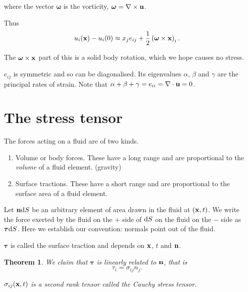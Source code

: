 \documentclass{notes}
\newcommand{\om}{\boldsymbol{\omega}}
\newcommand{\bt}{\boldsymbol{\tau}}
\theoremstyle{plain}
\newtheorem*{theorem}{Theorem}
\begin{document}
where the vector $\om$ is the vorticity, $\om = \nabla \times \vu$.

Thus
\[
u_i(\vx) - u_i(0) \approx x_j e_{i j} + \frac{1}{2} \left( \om \times \vx
\right)_i.
\]

The $\om \times \vx$ part of this is a solid body rotation, which we
hope causes no stress.\label{ref:vnostress}

$e_{i j}$ is symmetric and so can be diagonalised.  Its eigenvalues
$\alpha$, $\beta$ and $\gamma$ are the principal rates of strain.
Note that $\alpha + \beta + \gamma = e_{i i} = \nabla \cdot \mathbf{u} = 0$.

\section{The stress tensor}\label{sec:stress}

The forces acting on a fluid are of two kinds.
\begin{enumerate}
\item Volume or body forces.  These have a long range and are proportional
to the \emph{volume} of a fluid element.  (gravity)
\item Surface tractions.  These have a short range and are proportional
to the surface area of a fluid element.
\end{enumerate}

Let $\mathbf{n} \mathrm{d} S$ be an arbitrary element of area drawn in the fluid at
$(\mathbf{x},t)$.  We write the force exerted by the fluid on the
$+$ side of $\mathrm{d} S$ on the fluid on the $-$ side as $\bt \ud S$.  Here
we establish our convention: normals point out of the fluid.

$\bt$ is called the surface traction and depends on $\mathbf{x}$, $t$ and $\mathbf{n}$.

\begin{theorem}
We claim that $\bt$ is linearly related to $\mathbf{n}$, that is
\[
\tau_i = \sigma_{i j} n_j.
\]

$\sigma_{i j}(\mathbf{x},t)$ is a second rank tensor called the Cauchy stress
tensor.
\end{theorem}
\end{document}
